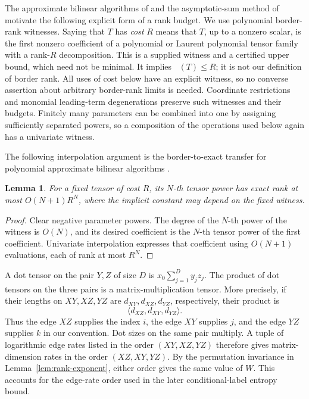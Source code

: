 \documentclass[11pt]{article}
\numberwithin{equation}{section}
\newtheorem{lemma}[theorem]{Lemma}
\theoremstyle{definition}
\theoremstyle{remark}
\DeclareMathOperator{\brank}{\underline R}
\begin{document}
The approximate bilinear algorithms of \citet{bini} and the
asymptotic-sum method of \citet{schonhage} motivate the following
explicit form of a rank budget.  We use polynomial border-rank witnesses.
Saying that \(T\) has \emph{cost} \(R\) means that \(T\), up to a nonzero
scalar, is the first nonzero coefficient of a polynomial or Laurent
polynomial tensor family with a rank-\(R\) decomposition.
This is a supplied witness and a certified upper bound, which need not
be minimal.  It implies \(\brank(T)\le R\); it is not our definition of
border rank.  All uses of cost below have an explicit witness, so no
converse assertion about arbitrary border-rank limits is needed.
Coordinate restrictions and monomial leading-term degenerations preserve
such witnesses and their budgets.  Finitely many parameters can be
combined into one by assigning sufficiently separated powers, so a
composition of the operations used below again has a univariate witness.

The following interpolation argument is the border-to-exact transfer
for polynomial approximate bilinear algorithms \cite{bini}.

\begin{lemma}\label{lem:border-overhead}
For a fixed tensor of cost \(R\), its \(N\)-th tensor power has exact
rank at most \(O(N+1)R^N\), where the implicit constant may depend on
the fixed witness.
\end{lemma}

\begin{proof}
Clear negative parameter powers.
The degree of the \(N\)-th power of the witness is \(O(N)\), and its
desired coefficient is the \(N\)-th tensor power of the first
coefficient.  Univariate interpolation expresses that coefficient using
\(O(N+1)\) evaluations, each of rank at most \(R^N\).
\end{proof}

A dot tensor on the pair \(Y,Z\) of size \(D\) is
\(x_0\sum_{j=1}^D y_jz_j\).
The product of dot tensors on the three pairs is a matrix-multiplication
tensor.  More precisely, if their lengths on \(XY,XZ,YZ\) are
\(d_{XY},d_{XZ},d_{YZ}\), respectively, their product is
\[
 \langle d_{XZ},d_{XY},d_{YZ}\rangle.
\]
Thus the edge \(XZ\) supplies the index \(i\), the edge \(XY\)
supplies \(j\), and the edge \(YZ\) supplies \(k\) in our convention.
Dot sizes on the same pair multiply.  A tuple of logarithmic edge rates
listed in the order \((XY,XZ,YZ)\) therefore gives matrix-dimension
rates in the order \((XZ,XY,YZ)\).  By the permutation invariance in
Lemma~\ref{lem:rank-exponent}, either order gives the same value of
\(W\).  This accounts for the edge-rate order used in the later
conditional-label entropy bound.
\end{document}
